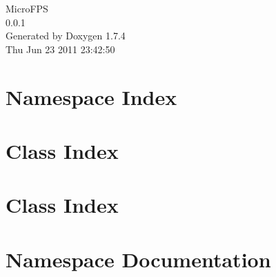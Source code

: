 \documentclass[a4paper]{book}
\begin{document}
\hypersetup{pageanchor=false}
\begin{titlepage}
\vspace*{7cm}
\begin{center}
{\Large MicroFPS \\[1ex]\large 0.0.1 }\\
\vspace*{1cm}
{\large Generated by Doxygen 1.7.4}\\
\vspace*{0.5cm}
{\small Thu Jun 23 2011 23:42:50}\\
\end{center}
\end{titlepage}
\clearemptydoublepage
{}
\tableofcontents
\clearemptydoublepage
{}
\hypersetup{pageanchor=true}
\chapter{Namespace Index}

\chapter{Class Index}

\chapter{Class Index}

\chapter{Namespace Documentation}

\end{document}
